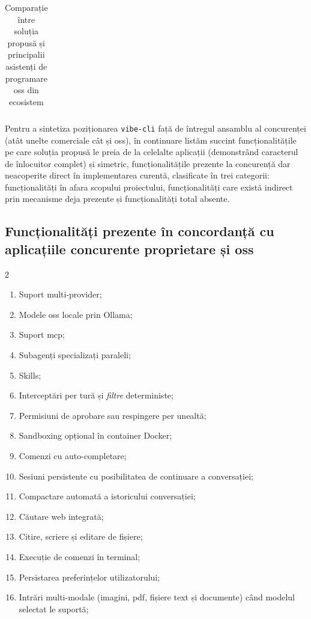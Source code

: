 \documentclass[12pt, a4paper, oneside, romanian]{teza-upb}
\begin{document}
\begin{table}[H]
\begin{tabularx}{\textwidth}{@{} >{\hsize=0.55\hsize\RaggedRight}X >{\hsize=0.95\hsize\RaggedRight}X >{\hsize=1.25\hsize\RaggedRight}X >{\hsize=1.25\hsize\RaggedRight}X @{}}
        \bottomrule
      \end{tabularx}
      \caption{Comparație între soluția propusă și principalii asistenți de programare \ac{oss} din ecosistem}
      \label{tab:comparatie_oss}
    \end{table}

    Pentru a sintetiza poziționarea \texttt{vibe-cli} față de întregul ansamblu al concurenței 
    (atât unelte comerciale cât și \ac{oss}), în continuare listăm succint funcționalitățile pe care soluția propusă 
    le preia de la celelalte aplicații (demonstrând caracterul de înlocuitor complet) și simetric, 
    funcționalitățile prezente la concurență dar neacoperite direct în implementarea curentă, clasificate în trei categorii: 
    funcționalități în afara scopului proiectului, funcționalități care există indirect prin mecanisme deja prezente 
    și funcționalități total absente.

    \subsection{Funcționalități prezente în concordanță cu aplicațiile concurente proprietare și \ac{oss}}

    \begin{multicols}{2}
      \begin{enumerate}\itemsep=0pt\parsep=0pt 
        \item Suport multi-provider;
        \item Modele \ac{oss} locale prin Ollama;
        \item Suport \ac{mcp};
        \item Subagenți specializați paraleli;
        \item Skills;
        \item Interceptări per tură și \textit{filtre} deterministe;
        \item Permisiuni de aprobare sau respingere per unealtă;
        \item Sandboxing opțional în container Docker;
        \item Comenzi cu auto-completare;
        \item Sesiuni persistente cu posibilitatea de continuare a conversației;
        \item Compactare automată a istoricului conversației;
        \item Căutare web integrată;
        \item Citire, scriere și editare de fișiere;
        \item Execuție de comenzi în terminal;
        \item Persistarea preferințelor utilizatorului;
        \item Intrări multi-modale (imagini, \ac{pdf}, fișiere text și documente) când modelul selectat le suportă;
      \end{enumerate}
    \end{multicols}
\end{document}
